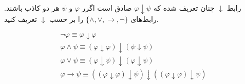 رابط $\downarrow$ چنان تعریف شده که $\varphi\downarrow\psi$ صادق است اگرر $\varphi$ و $\psi$ هر دو کاذب باشند. رابط‌های
$\{\wedge,\vee,\to,\neg\}$
را بر حسب $\downarrow$ تعریف کنید.
\begin{ans}
    \begin{gather*}
        \neg\varphi\equiv\varphi\downarrow\varphi \\
        \varphi\wedge\psi\equiv(\varphi\downarrow\varphi)\downarrow(\psi\downarrow\psi) \\
        \varphi\vee\psi\equiv(\varphi\downarrow\psi)\downarrow(\varphi\downarrow\psi) \\
        \varphi\to\psi\equiv((\varphi\downarrow\varphi)\downarrow\psi)\downarrow((\varphi\downarrow\varphi)\downarrow\psi)
    \end{gather*}
\end{ans}
